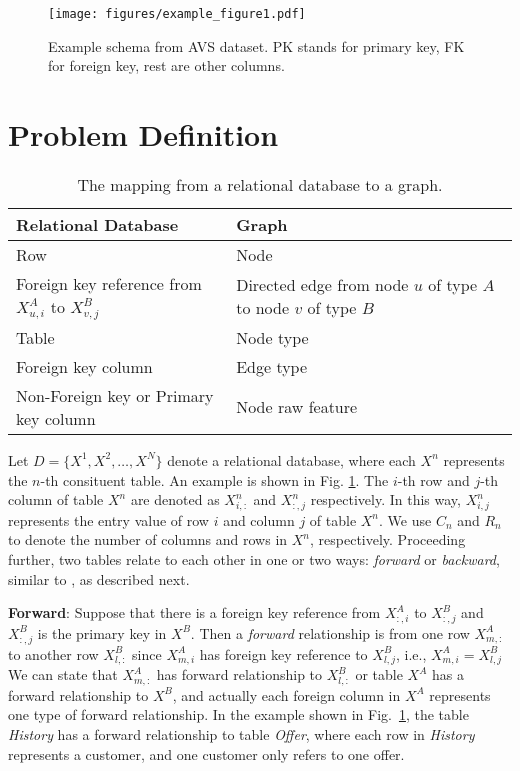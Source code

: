 \begin{figure}
    \centering
    \texttt{[image: figures/example\_figure1.pdf]}
    \caption{Example schema from AVS dataset. PK stands for primary key, FK for foreign key, rest are other columns.}
    \label{fig:AVS}
\end{figure}

\section{Problem Definition}\label{sec:problem_definition}

\begin{table*}
    \caption{The mapping from a relational database to a graph.}
    \centering
    \begin{tabularx}{0.9\textwidth}{p{8cm}l}
        \toprule
        \textbf{Relational Database} & \textbf{Graph} \\
        \midrule
        Row & Node \\
        Foreign key reference from $X^{A}_{u,i}$ to $X^{B}_{v,j}$ & Directed edge from node $u$ of type $A$ to node $v$ of type $B$ \\
        Table & Node type \\
        Foreign key column & Edge type \\
        Non-Foreign key or Primary key column & Node raw feature \\
        \bottomrule
    \end{tabularx}
    \label{tab:rel2graph}
\end{table*}

Let $D=\{X^1, X^2, \ldots , X^N\}$ denote a relational database, where each $X^n$ represents the $n$-th consituent table. An example is shown in Fig. \ref{fig:AVS}.
The $i$-th row and $j$-th column of table $X^n$ are denoted as $X^{n}_{i,:}$ and $X^{n}_{:, j}$ respectively. In this way, $X^{n}_{i,j}$ represents the entry value of row $i$ and column $j$ of table $X^n$. We use $C_n$ and $R_n$ to denote the number of columns and rows in $X^n$, respectively. Proceeding further, two tables relate to each other in one or two ways: \textit{forward} or \textit{backward}, similar to \cite{kanter2015deep}, as described next.

\header
\textbf{Forward}: Suppose that there is a foreign key reference from $X^{A}_{:,i}$ to $X^{B}_{:,j}$ and $X^{B}_{:,j}$ is the primary key in $X^B$. Then a \textit{forward} relationship is from one row $X^{A}_{m, :}$ to another row $X^{B}_{l, :}$ since $X^{A}_{m, i}$ has foreign key reference to $X^{B}_{l, j}$, i.e., $X^{A}_{m, i} = X^{B}_{l, j}$  
We can state that $X^A_{m,:}$ has forward relationship to $X^B_{l,:}$ or table $X^{A}$ has a forward relationship to $X^{B}$, and actually each foreign column in $X^{A}$ represents one type of forward relationship. In the example shown in Fig.~\ref{fig:AVS}, the table \textit{History} has a forward relationship to table \textit{Offer}, where each row in \textit{History} represents a customer, and one customer only refers to one offer.

